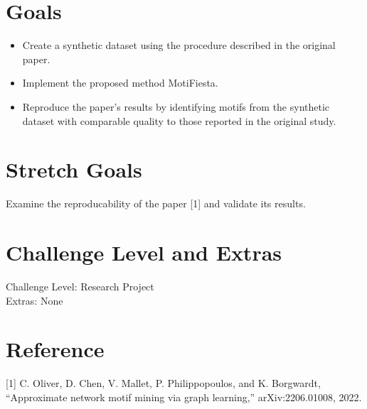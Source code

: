 \documentclass{article}
\begin{document}
\section{Goals}
\begin{itemize}
    \item Create a synthetic dataset using the procedure described in the original paper.
    \item Implement the proposed method MotiFiesta.
    \item Reproduce the paper's results by identifying motifs from the synthetic dataset with comparable quality to those reported in the original study.
\end{itemize}

\section{Stretch Goals}
Examine the reproducability of the paper [1] and validate its results.
\section{Challenge Level and Extras}
Challenge Level: Research Project \\
Extras: None

\section{Reference}
[1] C. Oliver, D. Chen, V. Mallet, P. Philippopoulos, and K. Borgwardt, “Approximate network motif mining via graph learning,” arXiv:2206.01008, 2022.
\end{document}

